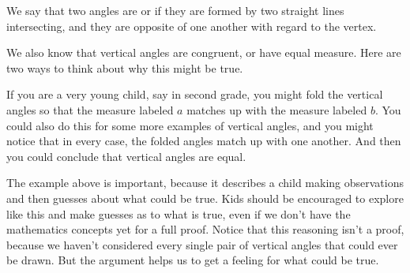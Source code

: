 \documentclass{ximera}
\begin{document}
\begin{image}
\end{image}

We say that two angles are  or  if they are formed by two straight lines intersecting, and they are opposite of one another with regard to the vertex.
\begin{image}
\end{image}

We also know that vertical angles are congruent, or have equal measure. Here are two ways to think about why this might be true.

\begin{example}
If you are a very young child, say in second grade, you might fold the vertical angles so that the measure labeled $a$ matches up with the measure labeled $b$. You could also do this for some more examples of vertical angles, and you might notice that in every case, the folded angles match up with one another. And then you could conclude that vertical angles are equal.
\end{example}

The example above is important, because it describes a child making observations and then guesses about what could be true. Kids should be encouraged to explore like this and make guesses as to what is true, even if we don't have the mathematics concepts yet for a full proof. Notice that this reasoning isn't a proof, because we haven't considered every single pair of vertical angles that could ever be drawn. But the argument helps us to get a feeling for what could be true. 
\end{document}
